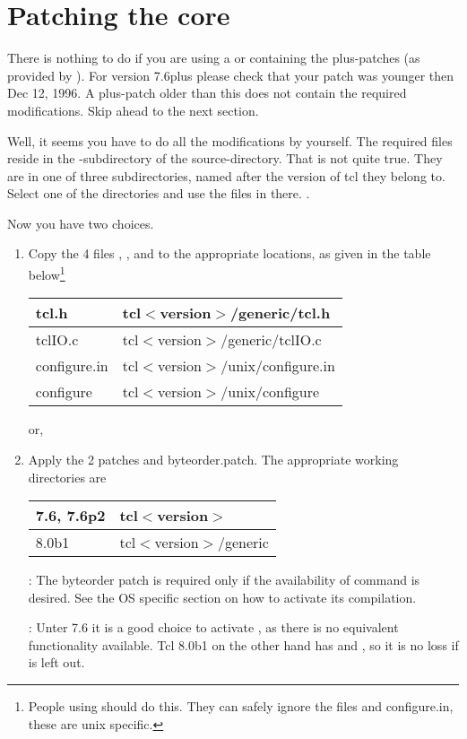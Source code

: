 \documentclass {report}
\begin{document}
\chapter  {Patching the core}\label {scalpel}

There is nothing to do if you are using a \tclsh{} or \wish{}
containing the plus-patches (as provided by \jan). For version 7.6plus
please check that your patch was younger then Dec 12, 1996. A
plus-patch older than this does not contain the required
modifications. Skip ahead to the next section.


Well, it seems you have to do all the modifications by yourself. The
required files reside in the -subdirectory of the
source-directory. That is not quite true. They are in one of three
subdirectories, named after the version of tcl they belong to. Select
one of the directories and use the files in there. .

Now you have two choices.

\begin {enumerate}
\item	Copy the 4 files , , 
	and  to the appropriate locations, as given
	in the table below\footnote {People using \win{} should do
	this. They can safely ignore the files  and \file
	{configure.in}, these are unix specific.} 

	\begin {tabular} {|l|l|} \hline
	tcl.h		& tcl$<$version$>$/generic/tcl.h	\\ \hline
	tclIO.c		& tcl$<$version$>$/generic/tclIO.c	\\ \hline
	configure.in	& tcl$<$version$>$/unix/configure.in	\\ \hline
	configure	& tcl$<$version$>$/unix/configure	\\ \hline
	\end {tabular}

	or,

\item	Apply the 2 patches  and \file
	{byteorder.patch}. The appropriate working directories are

	\begin {tabular} {|l|l|} \hline
	7.6, 7.6p2	& tcl$<$version$>$		\\ \hline
	8.0b1		& tcl$<$version$>$/generic	\\ \hline
	\end {tabular}

	: The byteorder patch is required only if the
	availability of command  is desired. See the OS
	specific section on how to activate its compilation.

	: Unter 7.6 it is a good choice to
	activate , as there is no equivalent functionality
	available. Tcl 8.0b1 on the other hand has  and
	, so it is no loss if  is left out.

\end   {enumerate}
\end{document}
